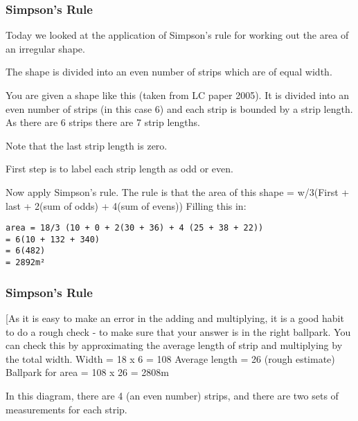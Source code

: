 \documentclass{beamer}
\begin{document}
\begin{frame}[fragile]
\frametitle{Simpson's Rule}



Today we looked at the application of Simpson's rule for working out the area of an irregular shape.

The shape is divided into an even number of strips which are of equal width.

\end{frame}
\begin{frame}[fragile]

You are given a shape like this (taken from LC paper 2005).
It is divided into an even number of strips (in this case 6) and each strip is bounded by a strip length. As there are 6 strips there are 7 strip lengths.

Note that the last strip length is zero.


First step is to label each strip length as odd or even.


\end{frame}
\begin{frame}[fragile]


Now apply Simpson's rule. 
The rule is that the area of this shape
= w/3(First + last + 2(sum of odds) + 4(sum of evens)) 
Filling this in:
\begin{verbatim}
area = 18/3 (10 + 0 + 2(30 + 36) + 4 (25 + 38 + 22))
= 6(10 + 132 + 340)
= 6(482)
= 2892m²
\end{verbatim}
\end{frame}
\begin{frame}[fragile]
	\frametitle{Simpson's Rule}
	\Large
[As it is easy to make an error in the adding and multiplying, it is a good habit to do a rough check - to make sure that your answer is in the right ballpark. You can check this by approximating the average length of strip and multiplying by the total width. Width = 18 x 6 = 108 Average length = 26 (rough estimate) Ballpark for area = 108 x 26 = 2808m%


In this diagram, there are 4 (an even number) strips, and there are two sets of measurements for each strip.
\end{frame}
\end{document}
